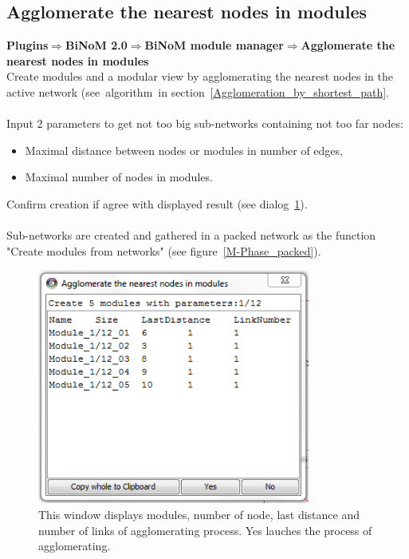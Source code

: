 \subsection{Agglomerate the nearest nodes in modules}
\textbf{Plugins$\Rightarrow$BiNoM 2.0$\Rightarrow$BiNoM module manager$\Rightarrow$Agglomerate the nearest nodes in modules}\\
Create modules and a modular view by agglomerating the nearest nodes in the active network (see~algorithm~in section~\ref{Agglomeration_by_shortest_path}.\\\\
Input 2 parameters to get not too big sub-networks containing not too far nodes:
\begin{itemize}
\item Maximal distance between nodes or modules in number of edges,
\item Maximal number of nodes in modules.
\end{itemize}
Confirm creation if agree with displayed result (see dialog~\ref{Agglomerate_in_modules_dialog}).\\\\
Sub-networks are created and gathered in a packed network as the function "Create modules from networks" (see figure~\ref{M-Phase_packed}).
\begin{figure}
\centering
\includegraphics[width=0.8\textwidth]{graphics/Agglomerate_in_modules_dialog}
\caption{This window displays modules, number of node, last distance and number of links of agglomerating process. Yes lauches the process of agglomerating.}
\label{Agglomerate_in_modules_dialog}
\end{figure}
